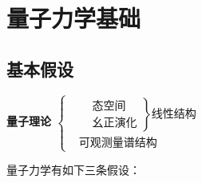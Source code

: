 \section{量子力学基础}
\subsection{基本假设}
\begin{center}
\large\textbf{量子理论
$\left\{
    \begin{aligned}
        &\left.
            \begin{aligned}
                &\text{态空间} \\
                &\text{幺正演化}
        \end{aligned}\right\}\text{线性结构}\\
        &\text{可观测量谱结构}
    \end{aligned}
\right.$
}
\end{center}
量子力学有如下三条假设：
